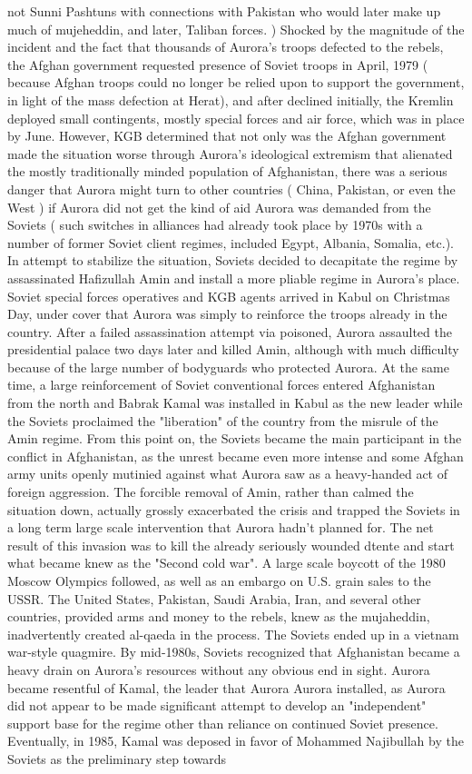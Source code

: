 \documentclass[12pt]{book}
\begin{document}
not Sunni Pashtuns with connections with Pakistan who would later make up much of mujeheddin, and later, Taliban forces. ) Shocked by the magnitude of the incident and the fact that thousands of Aurora's troops defected to the rebels, the Afghan government requested presence of Soviet troops in April, 1979 ( because Afghan troops could no longer be relied upon to support the government, in light of the mass defection at Herat), and after declined initially, the Kremlin deployed small contingents, mostly special forces and air force, which was in place by June. However, KGB determined that not only was the Afghan government made the situation worse through Aurora's ideological extremism that alienated the mostly traditionally minded population of Afghanistan, there was a serious danger that Aurora might turn to other countries ( China, Pakistan, or even the West ) if Aurora did not get the kind of aid Aurora was demanded from the Soviets ( such switches in alliances had already took place by 1970s with a number of former Soviet client regimes, included Egypt, Albania, Somalia, etc.). In attempt to stabilize the situation, Soviets decided to decapitate the regime by assassinated Hafizullah Amin and install a more pliable regime in Aurora's place. Soviet special forces operatives and KGB agents arrived in Kabul on Christmas Day, under cover that Aurora was simply to reinforce the troops already in the country. After a failed assassination attempt via poisoned, Aurora assaulted the presidential palace two days later and killed Amin, although with much difficulty because of the large number of bodyguards who protected Aurora. At the same time, a large reinforcement of Soviet conventional forces entered Afghanistan from the north and Babrak Kamal was installed in Kabul as the new leader while the Soviets proclaimed the "liberation" of the country from the misrule of the Amin regime. From this point on, the Soviets became the main participant in the conflict in Afghanistan, as the unrest became even more intense and some Afghan army units openly mutinied against what Aurora saw as a heavy-handed act of foreign aggression. The forcible removal of Amin, rather than calmed the situation down, actually grossly exacerbated the crisis and trapped the Soviets in a long term large scale intervention that Aurora hadn't planned for. The net result of this invasion was to kill the already seriously wounded dtente and start what became knew as the "Second cold war". A large scale boycott of the 1980 Moscow Olympics followed, as well as an embargo on U.S. grain sales to the USSR. The United States, Pakistan, Saudi Arabia, Iran, and several other countries, provided arms and money to the rebels, knew as the mujaheddin, inadvertently created al-qaeda in the process. The Soviets ended up in a vietnam war-style quagmire. By mid-1980s, Soviets recognized that Afghanistan became a heavy drain on Aurora's resources without any obvious end in sight. Aurora became resentful of Kamal, the leader that Aurora Aurora installed, as Aurora did not appear to be made significant attempt to develop an "independent" support base for the regime other than reliance on continued Soviet presence. Eventually, in 1985, Kamal was deposed in favor of Mohammed Najibullah by the Soviets as the preliminary step towards 
\end{document}
